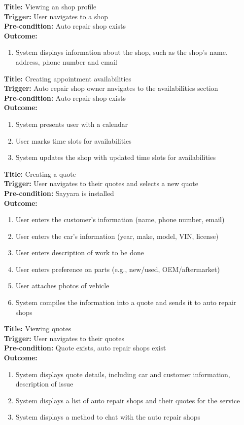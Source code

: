 \documentclass[12pt]{article}
\begin{document}
\textbf{Title:} Viewing an shop profile\\
\textbf{Trigger:} User navigates to a shop\\
\textbf{Pre-condition:} Auto repair shop exists\\
\textbf{Outcome:}
\begin{enumerate}
	\item System displays information about the shop, such as the shop's name, address, phone number and
	      email
\end{enumerate}

\textbf{Title:} Creating appointment availabilities\\
\textbf{Trigger:} Auto repair shop owner navigates to the availabilities section\\
\textbf{Pre-condition:} Auto repair shop exists\\
\textbf{Outcome:}
\begin{enumerate}
	\item System presents user with a calendar
	\item User marks time slots for availabilities
	\item System updates the shop with updated time slots for availabilities
\end{enumerate}

\textbf{Title:} Creating a quote\\
\textbf{Trigger:} User navigates to their quotes and selects a new quote\\
\textbf{Pre-condition:} Sayyara is installed\\
\textbf{Outcome:}
\begin{enumerate}
	\item User enters the customer's information (name, phone number, email)
	\item User enters the car's information (year, make, model, VIN, license)
	\item User enters description of work to be done
	\item User enters preference on parts (e.g., new/used, OEM/aftermarket)
	\item User attaches photos of vehicle
	\item System compiles the information into a quote and sends it to auto repair shops
\end{enumerate}

\textbf{Title:} Viewing quotes\\
\textbf{Trigger:} User navigates to their quotes\\
\textbf{Pre-condition:} Quote exists, auto repair shops exist\\
\textbf{Outcome:}
\begin{enumerate}
	\item System displays quote details, including car and customer information, description of issue
	\item System displays a list of auto repair shops and their quotes for the service
	\item System displays a method to chat with the auto repair shops
\end{enumerate}
\end{document}
